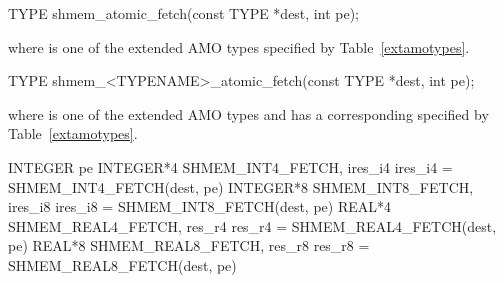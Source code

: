 
\begin{apidefinition}

\begin{C11synopsis}
TYPE shmem_atomic_fetch(const TYPE *dest, int pe);
\end{C11synopsis}
where \TYPE{} is one of the extended \ac{AMO} types specified by
Table~\ref{extamotypes}.

\begin{Csynopsis}
TYPE shmem_<TYPENAME>_atomic_fetch(const TYPE *dest, int pe);
\end{Csynopsis}
where \TYPE{} is one of the extended \ac{AMO} types and has a corresponding
\TYPENAME{} specified by Table~\ref{extamotypes}.

\begin{Fsynopsis}
INTEGER pe
INTEGER*4 SHMEM_INT4_FETCH, ires_i4
ires_i4 = SHMEM_INT4_FETCH(dest, pe)
INTEGER*8 SHMEM_INT8_FETCH, ires_i8
ires_i8 = SHMEM_INT8_FETCH(dest, pe)
REAL*4 SHMEM_REAL4_FETCH, res_r4
res_r4 = SHMEM_REAL4_FETCH(dest, pe)
REAL*8 SHMEM_REAL8_FETCH, res_r8
res_r8 = SHMEM_REAL8_FETCH(dest, pe)
\end{Fsynopsis}

\begin{apiarguments}


\end{apiarguments}




\end{apidefinition}
